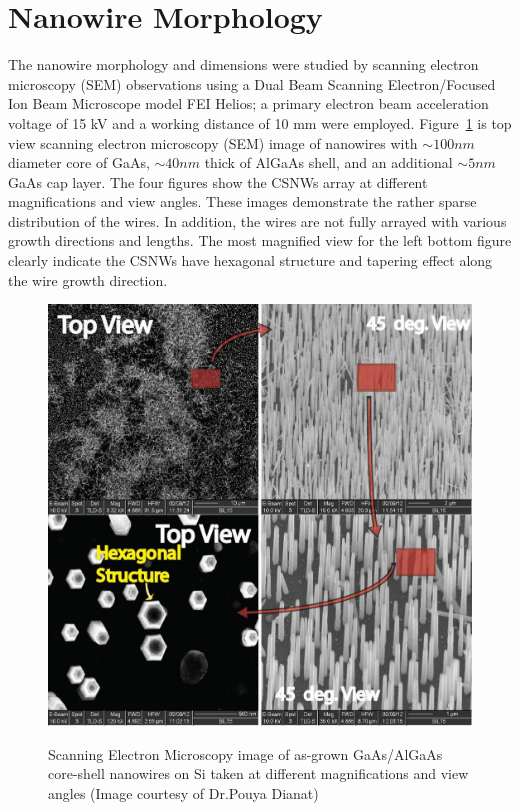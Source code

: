 \section{Nanowire Morphology} 

The nanowire morphology and dimensions were studied by scanning electron
microscopy (SEM) observations using a Dual Beam Scanning Electron/Focused Ion
Beam Microscope model FEI Helios; a primary electron beam acceleration voltage
of 15 kV and a working distance of 10 mm were employed. Figure~\ref{SEMNW} is
top view scanning electron microscopy (SEM) image of nanowires with $\sim100nm$
diameter core of GaAs, $\sim40nm$ thick of AlGaAs shell, and an additional
$\sim5nm$ GaAs cap layer. The four figures show the CSNWs array at different
magnifications and view angles. These images demonstrate the rather sparse
distribution of the wires. In addition, the wires are not fully arrayed with
various growth directions and lengths. The most magnified view for the left
bottom figure clearly indicate the CSNWs have hexagonal structure and tapering
effect along the wire growth direction.

\begin{figure}
  \caption{Scanning Electron Microscopy image of as-grown GaAs/AlGaAs core-shell nanowires on Si taken at different magnifications and view angles (Image courtesy of Dr.Pouya Dianat)}
  \centering
  \includegraphics[width=\textwidth]{pictures/Data/SEMNW}
  \label{SEMNW}
\end{figure}

